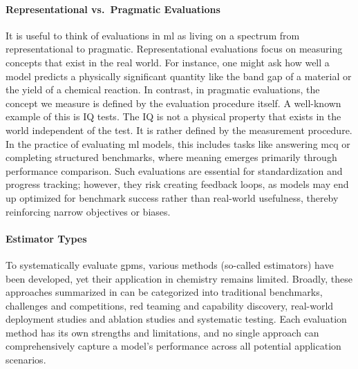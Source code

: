 \paragraph{Representational vs.\ Pragmatic Evaluations}
It is useful to think of evaluations in \gls{ml} as living on a spectrum from representational to pragmatic. 
Representational evaluations focus on measuring concepts that exist in the real world. For instance, one might ask how well a model predicts a physically significant quantity like the band gap of a material or the yield of a chemical reaction. In contrast, in pragmatic evaluations, the concept we measure is defined by the evaluation procedure itself. A well-known example of this is IQ tests. The IQ is not a physical property that exists in the world independent of the test. It is rather defined by the measurement procedure. 
In the practice of evaluating \gls{ml} models, this includes tasks like answering \gls{mcq} or completing structured benchmarks, where meaning emerges primarily through performance comparison. Such evaluations are essential for standardization and progress tracking; however, they risk creating feedback loops, as models may end up optimized for benchmark success rather than real-world usefulness, thereby reinforcing narrow objectives or biases.\autocite{alampara2025lessons, skalse2022defining}

\paragraph{Estimator Types} To systematically evaluate \glspl{gpm}, various methods (so-called estimators) have been developed, yet their application in chemistry remains limited.
Broadly, these approaches summarized in  can be categorized into traditional benchmarks, challenges and competitions, red teaming and capability discovery, real-world deployment studies and ablation studies and systematic testing. 
Each evaluation method has its own strengths and limitations, and no single approach can comprehensively capture a model’s performance across all potential application scenarios.

